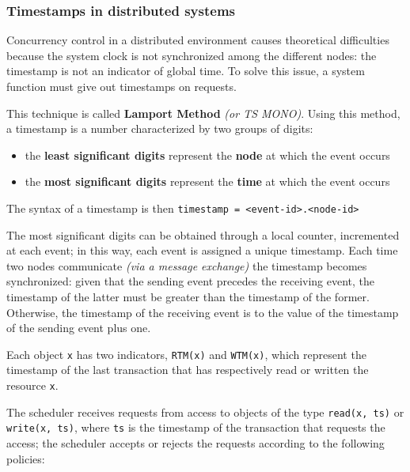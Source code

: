 \documentclass[english]{article}
\begin{document}
\subsubsection{Timestamps in distributed systems}

Concurrency control in a distributed environment causes theoretical difficulties because the system clock is not synchronized among the different nodes:
the timestamp is not an indicator of global time.
To solve this issue, a system function must give out timestamps on requests.

This technique is called \textbf{Lamport Method} \textit{(or TS MONO)}.
Using this method, a timestamp is a number characterized by two groups of digits:

\begin{itemize}
  \item the \textbf{least significant digits} represent the \textbf{node} at which the event occurs
  \item the \textbf{most significant digits} represent the \textbf{time} at which the event occurs
\end{itemize}

The syntax of a timestamp is then \texttt{timestamp = <event-id>.<node-id>}

\bigskip
The most significant digits can be obtained through a local counter, incremented at each event; in this way, each event is assigned a unique timestamp.
Each time two nodes communicate \textit{(via a message exchange)} the timestamp becomes synchronized: given that the sending event precedes the receiving event, the timestamp of the latter must be greater than the timestamp of the former.
Otherwise, the timestamp of the receiving event is  to the value of the timestamp of the sending event plus one.

\bigskip
Each object \texttt{x} has two indicators, \texttt{RTM(x)} and \texttt{WTM(x)}, which represent the timestamp of the last transaction that has respectively read or written the resource \texttt{x}.

The scheduler receives requests from access to objects of the type \texttt{read(x, ts)} or \texttt{write(x, ts)}, where \texttt{ts} is the timestamp of the transaction that requests the access; the scheduler accepts or rejects the requests according to the following policies:
\end{document}
